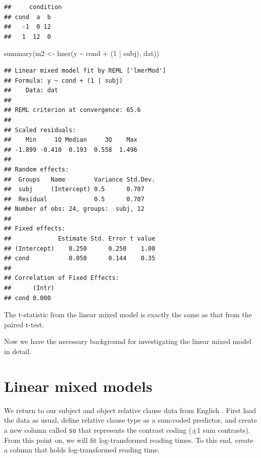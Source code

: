 \documentclass[
  12pt,
]{krantz}
\newenvironment{Shaded}{\begin{snugshade}}{\end{snugshade}}
\newcommand{\DecValTok}[1]{\textcolor[rgb]{0.00,0.00,0.81}{#1}}
\newcommand{\FunctionTok}[1]{\textcolor[rgb]{0.00,0.00,0.00}{#1}}
\newcommand{\NormalTok}[1]{#1}
\newcommand{\OtherTok}[1]{\textcolor[rgb]{0.56,0.35,0.01}{#1}}
\newcommand{\SpecialCharTok}[1]{\textcolor[rgb]{0.00,0.00,0.00}{#1}}
\newcommand{\StringTok}[1]{\textcolor[rgb]{0.31,0.60,0.02}{#1}}
\theoremstyle{definition}
\theoremstyle{definition}
\theoremstyle{definition}
\theoremstyle{definition}
\theoremstyle{remark}
\begin{document}
\begin{verbatim}
##     condition
## cond  a  b
##   -1  0 12
##   1  12  0
\end{verbatim}

\begin{Shaded}
\begin{Highlighting}[]
\FunctionTok{summary}\NormalTok{(m2 }\OtherTok{\textless{}{-}} \FunctionTok{lmer}\NormalTok{(y }\SpecialCharTok{\textasciitilde{}}\NormalTok{ cond }\SpecialCharTok{+}\NormalTok{ (}\DecValTok{1} \SpecialCharTok{|}\NormalTok{ subj), dat))}
\end{Highlighting}
\end{Shaded}

\begin{verbatim}
## Linear mixed model fit by REML ['lmerMod']
## Formula: y ~ cond + (1 | subj)
##    Data: dat
## 
## REML criterion at convergence: 65.6
## 
## Scaled residuals: 
##    Min     1Q Median     3Q    Max 
## -1.899 -0.410  0.193  0.558  1.496 
## 
## Random effects:
##  Groups   Name        Variance Std.Dev.
##  subj     (Intercept) 0.5      0.707   
##  Residual             0.5      0.707   
## Number of obs: 24, groups:  subj, 12
## 
## Fixed effects:
##             Estimate Std. Error t value
## (Intercept)    0.250      0.250    1.00
## cond           0.050      0.144    0.35
## 
## Correlation of Fixed Effects:
##      (Intr)
## cond 0.000
\end{verbatim}

The t-statistic from the linear mixed model is exactly the same as that from the paired t-test.

Now we have the necessary background for investigating the linear mixed model in detail.

\hypertarget{linear-mixed-models}{%
\section{Linear mixed models}\label{linear-mixed-models}}

We return to our subject and object relative clause data from English \citep[Experiment 1 of][]{grodner}. First load the data as usual, define relative clause type as a sum-coded predictor, and create a new column called \texttt{so} that represents the contrast coding (\(\pm 1\) sum contrasts). From this point on, we will fit log-transformed reading times. To this end, create a column that holds log-transformed reading time.

\begin{Shaded}
\end{Shaded}
\end{document}
